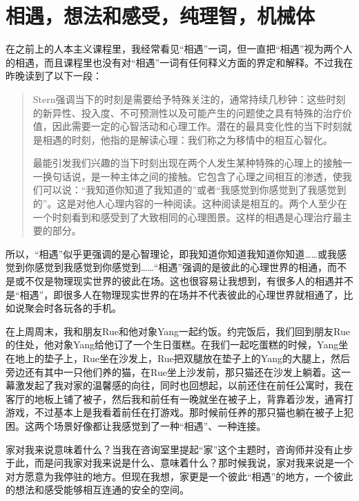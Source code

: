 \chapter{相遇，想法和感受，纯理智，机械体}






在之前上的人本主义课程里，我经常看见“相遇”一词，但一直把“相遇”视为两个人的相遇，而且课程里也没有对“相遇”一词有任何释义方面的界定和解释。不过我在昨晚读到了以下一段：

\blockquote{
Stern强调当下的时刻是需要给予特殊关注的，通常持续几秒钟：这些时刻的新异性、投入度、不可预测性以及可能产生的问题使之具有特殊的治疗价值，因此需要一定的心智活动和心理工作。潜在的最具变化性的当下时刻就是相遇的时刻，他指的是解读心理：我们称之为移情中的相互心智化。

最能引发我们兴趣的当下时刻出现在两个人发生某种特殊的心理上的接触一一换句话说，是一种主体之间的接触。它包含了心理之间相互的渗透，使我们可以说：“我知道你知道了我知道的”或者“我感觉到你感觉到了我感觉到的”。这是对他人心理内容的一种阅读。这种阅读是相互的。两个人至少在一个时刻看到和感受到了大致相同的心理图景。这样的相遇是心理治疗最主要的部分。

}

所以，“相遇”似乎更强调的是心智理论，即我知道你知道我知道你知道……或我感觉到你感觉到我感觉到你感觉到……“相遇”强调的是彼此的心理世界的相通，而不是或不仅是物理现实世界的彼此在场。这也很容易让我想到，有很多人的相遇并不是“相遇”，即很多人在物理现实世界的在场并不代表彼此的心理世界就相通了，比如说聚会时各玩各的手机。

在上周周末，我和朋友Rue和他对象Yang一起约饭。约完饭后，我们回到朋友Rue的住处，他对象Yang给他订了一个生日蛋糕。在我们一起吃蛋糕的时候，Yang坐在地上的垫子上，Rue坐在沙发上，Rue把双腿放在垫子上的Yang的大腿上，然后旁边还有其中一只他们养的猫，在Rue坐上沙发前，那只猫还在沙发上躺着。这一幕激发起了我对家的温馨感的向往，同时也回想起，以前还住在前任公寓时，我在客厅的地板上铺了被子，然后我和前任有一晚就坐在被子上，背靠着沙发，通宵打游戏，不过基本上是我看着前任在打游戏。那时候前任养的那只猫也躺在被子上犯困。这两个场景好像都让我感觉到了一种“相遇”、一种连接。

家对我来说意味着什么？当我在咨询室里提起“家”这个主题时，咨询师并没有止步于此，而是问我家对我来说是什么、意味着什么？那时候我说，家对我来说是一个对方愿意为我停驻的地方。但现在我想，家更是一个彼此“相遇”的地方，一个彼此的想法和感受能够相互连通的安全的空间。

